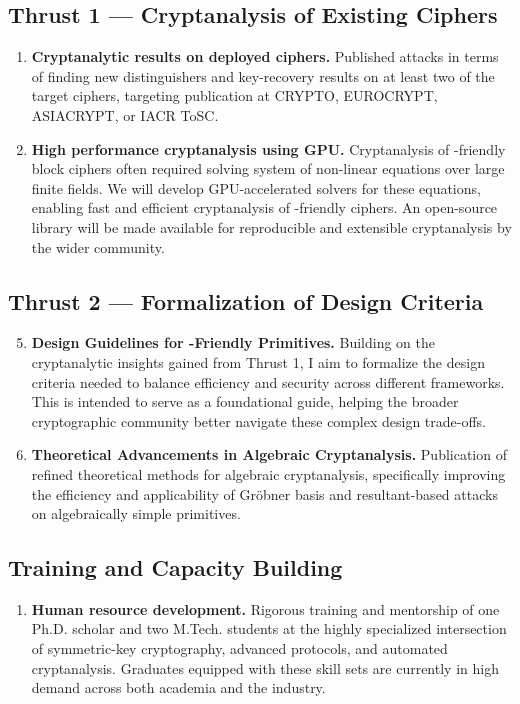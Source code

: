 	\subsection*{Thrust 1 — Cryptanalysis of Existing Ciphers}
	\begin{enumerate}[label=\textbf{D\arabic*.}, leftmargin=*, itemsep=2pt]
		\item \textbf{Cryptanalytic results on deployed ciphers.}
		Published attacks in terms of finding new distinguishers and key-recovery results on at least two of the target ciphers, targeting publication at CRYPTO, EUROCRYPT, ASIACRYPT, or IACR ToSC.
		
		\item \textbf{High performance cryptanalysis using GPU.}
		Cryptanalysis of -friendly block ciphers often required solving system of non-linear equations over large finite fields.
		We will develop GPU-accelerated solvers for these equations, enabling fast and efficient cryptanalysis of -friendly ciphers.
		An open-source library will be made available for reproducible and extensible cryptanalysis by the wider community.
	\end{enumerate}
	\subsection*{Thrust 2 — Formalization of Design Criteria}
	\begin{enumerate}[label=\textbf{D\arabic*.}, leftmargin=*, itemsep=2pt]
		\setcounter{enumi}{4} %
		\item \textbf{Design Guidelines for -Friendly Primitives.} 
		Building on the cryptanalytic insights gained from Thrust 1, I aim to formalize the design criteria needed to balance efficiency and security across different  frameworks.
		This is intended to serve as a foundational guide, helping the broader cryptographic community better navigate these complex design trade-offs.
		
		\item \textbf{Theoretical Advancements in Algebraic Cryptanalysis.}
		Publication of refined theoretical methods for algebraic cryptanalysis, specifically improving the efficiency and applicability of Gr\"obner basis and resultant-based attacks on algebraically simple primitives. 
	\end{enumerate}
	
	\subsection*{Training and Capacity Building}
	\begin{enumerate}[label=\textbf{D\arabic*.}, leftmargin=*, itemsep=2pt, start=7]
		\item \textbf{Human resource development.}
		Rigorous training and mentorship of one Ph.D. scholar and two M.Tech. students at the highly specialized intersection of symmetric-key cryptography, advanced protocols, and automated cryptanalysis.
		Graduates equipped with these skill sets are currently in high demand across both academia and the industry.
	\end{enumerate}
	
